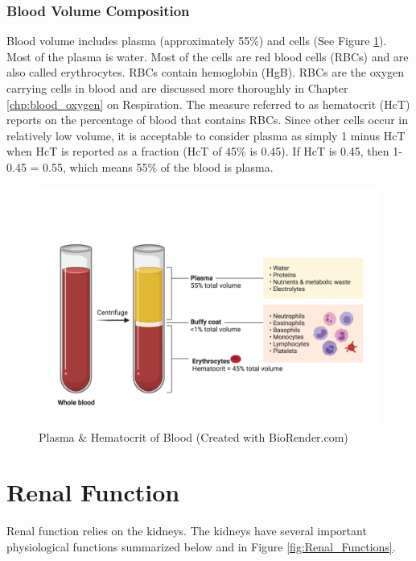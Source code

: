\subsubsection{Blood Volume Composition}

Blood volume includes plasma (approximately 55\%) and cells (See Figure \ref{fig:Hematocrit}). Most of the plasma is water. Most of the cells are red blood cells (RBCs) and are also called erythrocytes. RBCs contain hemoglobin (HgB). RBCs are the oxygen carrying cells in blood and are discussed more thoroughly in Chapter \ref{chp:blood_oxygen} on Respiration. The measure referred to as hematocrit (HcT) reports on the percentage of blood that contains RBCs. Since other cells occur in relatively low volume, it is acceptable to consider plasma as simply 1 minus HcT when HcT is reported as a fraction (HcT of 45\% is 0.45). If HcT is 0.45, then 1-0.45 = 0.55, which means 55\% of the blood is plasma.

\begin{figure}[!h]
    \centering
    \includegraphics[width=1\linewidth]{./figure/Hematocrit.png}
    \caption{Plasma \& Hematocrit of Blood \footnotesize{(Created with BioRender.com)}}
    \label{fig:Hematocrit}
\end{figure}

\section{Renal Function}

Renal function relies on the kidneys. The kidneys have several important physiological functions summarized below and in Figure \ref{fig:Renal_Functions}. 

